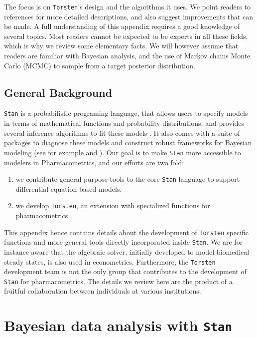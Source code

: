 \documentclass[11pt]{article}
\begin{document}
  The focus is on \texttt{Torsten}'s design and the algorithms it uses. We point readers
  to references for more detailed descriptions, and also suggest improvements
  that can be made.
  A full understanding of this appendix requires a good knowledge of several topics.
  Most readers cannot be expected to be experts in all these fields, which is
  why we review some elementary facts. We will however assume that readers are familiar
  with Bayesian analysis, and the use of Markov chains Monte Carlo (MCMC) to sample from
  a target posterior distribution.
  
  \subsection{General Background}
  
  \texttt{Stan} is a probabilistic programing language, that allows users to specify models
  in terms of mathematical functions and probability distributions,
  and provides several inference algorithms to fit these models \cite{Stan:2017}.
  It also comes with a suite of packages to diagnose these models
  and construct robust frameworks for Bayesian modeling (see for example
  \cite{Gabry:2017} and \cite{Betancourt:2018}).
  Our goal is to make \texttt{Stan} more accessible to modelers in Pharmacometrics,
  and our efforts are two fold:
  \begin{enumerate}
    \item we contribute general purpose tools to the core \texttt{Stan} language to support
    differential equation based models.
    \item we develop \texttt{Torsten}, an extension with specialized functions for pharmacometrics
    \cite{Gillespie:2018, Margossian:2016}.
  \end{enumerate}
  
  This appendix hence contains details about the development of \texttt{Torsten} specific functions
  and more general tools directly incorporated inside \texttt{Stan}.
  We are for instance aware that the algebraic solver, initially developed to model biomedical steady
  states, is also used in econometrics.
  Furthermore, the \texttt{Torsten} development team is not the only group that contributes to the development of
  \texttt{Stan} for pharmacometrics. The details we review here are the product of a fruitful collaboration
  between individuals at various institutions.
  
  \section{Bayesian data analysis with \texttt{Stan}}
  
\end{document}
